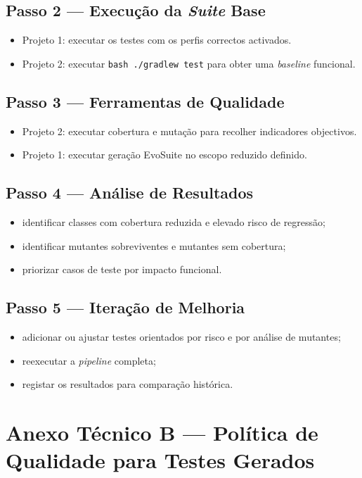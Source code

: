 \documentclass{article}
\begin{document}
\subsection{Passo 2 --- Execução da \emph{Suite} Base}
\begin{itemize}
    \item Projeto 1: executar os testes com os perfis correctos activados.
    \item Projeto 2: executar \texttt{bash ./gradlew test} para obter uma \emph{baseline} funcional.
\end{itemize}

\subsection{Passo 3 --- Ferramentas de Qualidade}
\begin{itemize}
    \item Projeto 2: executar cobertura e mutação para recolher indicadores objectivos.
    \item Projeto 1: executar geração EvoSuite no escopo reduzido definido.
\end{itemize}

\subsection{Passo 4 --- Análise de Resultados}
\begin{itemize}
    \item identificar classes com cobertura reduzida e elevado risco de regressão;
    \item identificar mutantes sobreviventes e mutantes sem cobertura;
    \item priorizar casos de teste por impacto funcional.
\end{itemize}

\subsection{Passo 5 --- Iteração de Melhoria}
\begin{itemize}
    \item adicionar ou ajustar testes orientados por risco e por análise de mutantes;
    \item reexecutar a \emph{pipeline} completa;
    \item registar os resultados para comparação histórica.
\end{itemize}

\section{Anexo Técnico B --- Política de Qualidade para Testes Gerados}
\end{document}
